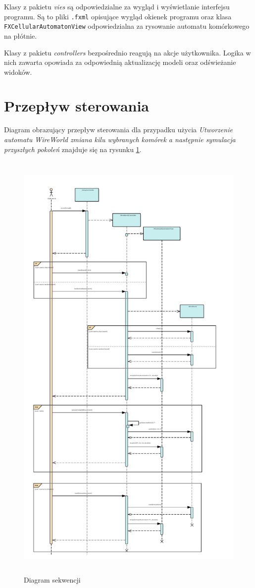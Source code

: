 \documentclass{report}
\begin{document}
Klasy z pakietu \textit{vies} są odpowiedzialne za wygląd i wyświetlanie interfejsu programu. Są to pliki \texttt{.fxml} opisujące wygląd okienek programu oraz klasa \texttt{FXCellularAutomatonView} odpowiedzialna za rysowanie automatu komórkowego na płótnie.

Klasy z pakietu \textit{controllers} bezpośrednio reagują na akcje użytkownika. Logika w nich zawarta opowiada za odpowiednią aktualizację modeli oraz odświeżanie widoków.

\section{Przepływ sterowania}
Diagram obrazujący przepływ sterowania dla przypadku użycia \textit{Utworzenie automatu WireWorld zmiana kilu wybranych komórek a następnie symulacja przyszłych pokoleń} znajduje się na rysunku \ref{fig:baisicWWSequense}.

\begin{figure}
	\centering
	\includegraphics[height=22cm]{Diagram_Sekwencji_Narysowanie_automatu_ww_symulacja_kilku_stanow}
	\caption{Diagram sekwencji}
	\label{fig:baisicWWSequense}
\end{figure}
\end{document}
